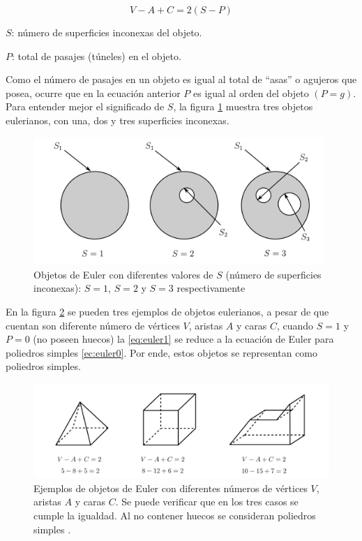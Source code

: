 \begin{equation}
V - A + C  = 2(S-P)
\label{eq:euler1}
\end{equation}

\begin{description}
\item $S$: número de superficies inconexas del objeto.
\item $P$: total de pasajes (túneles) en el objeto.
\end{description}

Como el número de pasajes en un objeto es igual al total de ``asas” o agujeros que posea, ocurre que en la ecuación anterior $P$ es igual al orden del objeto $(P = g)$.\newline
Para entender mejor el significado de $S$, la figura \ref{fig:euler} muestra tres objetos eulerianos, con una, dos y tres superficies inconexas.

\begin{figure}[ht]
\includegraphics[width=11cm]{Img/GEO/geo-euler0.jpg}
\centering
\caption{\footnotesize{Objetos de Euler con diferentes valores de $S$ (número de superficies inconexas): $S = 1$, $S = 2$ y $S = 3$ respectivamente \citep{Ramos2011}}}
\label{fig:euler}
\end{figure}

En la figura \ref{fig:euler1} se pueden tres ejemplos de objetos eulerianos, a pesar de que cuentan son diferente número de vértices $V$, aristas $A$ y caras $C$, cuando $S = 1$ y $P = 0$ (no poseen huecos) la \ref{eq:euler1} se reduce a la ecuación de Euler para poliedros simples \ref{ec:euler0}. Por ende, estos objetos se representan como poliedros simples.

\begin{figure}[ht]
\includegraphics[width=14cm]{Img/GEO/geo-euler1.jpg}
\centering
\caption{\footnotesize{Ejemplos de objetos de Euler con diferentes números de vértices $V$, aristas $A$ y caras $C$. Se puede verificar que en los tres casos se cumple la igualdad. Al no contener huecos se consideran poliedros simples \citep{Ramos2011}.}}
\label{fig:euler1}
\end{figure}


